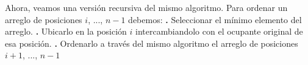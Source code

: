 \documentclass[10pt,a4paper]{article}
\begin{document}
\newline
\newline
Ahora, veamos una versión recursiva del mismo algoritmo.
\newline
\newline
Para ordenar un arreglo de posiciones $i$, ..., $n-1$ debemos:
\newline
\newline
\textbf{.} Seleccionar el mínimo elemento del arreglo.
\newline
\newline
\textbf{.} Ubicarlo en la posición $i$ intercambiandolo con el ocupante original de esa posición.
\newline
\newline
\textbf{.} Ordenarlo a través del mismo algoritmo el arreglo de posiciones $i+1$, ..., $n-1$
\newpage
\end{document}

